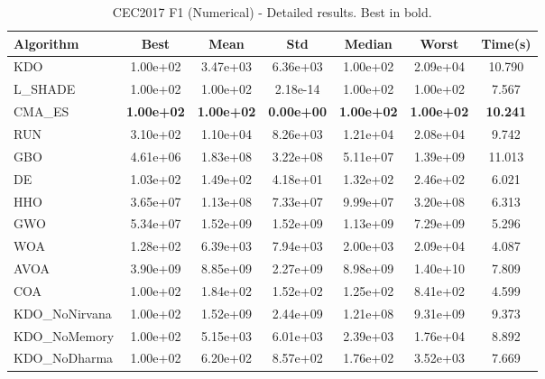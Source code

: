 \begin{table}[H]
\centering\small
\caption{CEC2017 F1 (Numerical) - Detailed results. Best in bold.}
\label{tab:cec2017_F1}
\begin{tabular}{lcccccc}
\toprule
\textbf{Algorithm} & \textbf{Best} & \textbf{Mean} & \textbf{Std} & \textbf{Median} & \textbf{Worst} & \textbf{Time(s)} \\
\midrule
KDO & 1.00e+02 & 3.47e+03 & 6.36e+03 & 1.00e+02 & 2.09e+04 & 10.790 \\
L_SHADE & 1.00e+02 & 1.00e+02 & 2.18e-14 & 1.00e+02 & 1.00e+02 & 7.567 \\
CMA_ES & \textbf{1.00e+02} & \textbf{1.00e+02} & \textbf{0.00e+00} & \textbf{1.00e+02} & \textbf{1.00e+02} & \textbf{10.241} \\
RUN & 3.10e+02 & 1.10e+04 & 8.26e+03 & 1.21e+04 & 2.08e+04 & 9.742 \\
GBO & 4.61e+06 & 1.83e+08 & 3.22e+08 & 5.11e+07 & 1.39e+09 & 11.013 \\
DE & 1.03e+02 & 1.49e+02 & 4.18e+01 & 1.32e+02 & 2.46e+02 & 6.021 \\
HHO & 3.65e+07 & 1.13e+08 & 7.33e+07 & 9.99e+07 & 3.20e+08 & 6.313 \\
GWO & 5.34e+07 & 1.52e+09 & 1.52e+09 & 1.13e+09 & 7.29e+09 & 5.296 \\
WOA & 1.28e+02 & 6.39e+03 & 7.94e+03 & 2.00e+03 & 2.09e+04 & 4.087 \\
AVOA & 3.90e+09 & 8.85e+09 & 2.27e+09 & 8.98e+09 & 1.40e+10 & 7.809 \\
COA & 1.00e+02 & 1.84e+02 & 1.52e+02 & 1.25e+02 & 8.41e+02 & 4.599 \\
KDO_NoNirvana & 1.00e+02 & 1.52e+09 & 2.44e+09 & 1.21e+08 & 9.31e+09 & 9.373 \\
KDO_NoMemory & 1.00e+02 & 5.15e+03 & 6.01e+03 & 2.39e+03 & 1.76e+04 & 8.892 \\
KDO_NoDharma & 1.00e+02 & 6.20e+02 & 8.57e+02 & 1.76e+02 & 3.52e+03 & 7.669 \\
\bottomrule
\end{tabular}
\end{table}
